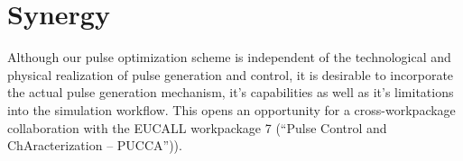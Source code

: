 \documentclass[12pt]{scrartcl}
\begin{document}
\section{Synergy}
Although our pulse optimization scheme is  independent of the technological and
physical realization of pulse generation and control, it is desirable to
incorporate the actual pulse generation mechanism, it's capabilities as well as
it's limitations into the simulation workflow.  This opens an opportunity for
a cross-workpackage collaboration with the EUCALL workpackage 7 (``Pulse Control and
ChAracterization -- PUCCA'')).




\printbibliography
\end{document}
